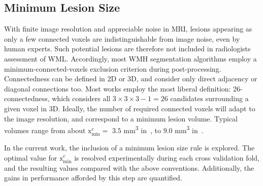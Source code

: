 \subsection{Minimum Lesion Size}\label{ss:vlr-minx}
With finite image resolution and appreciable noise in MRI,
lesions appearing as only a few connected voxels are indistinguishable from image noise,
even by human experts.
Such potential lesions are therefore not included in radiologists assessment of WML.
Accordingly, most WMH segmentation algorithms employ
a minimum-connected-voxels exclusion criterion during post-processing.
Connectedness can be defined in 2D or 3D,
and consider only direct adjacency or diagonal connections too.
Most works employ the most liberal definition: 26-connectedness,
which considers all $3\times3\times3-1=26$ candidates surrounding a given voxel in 3D.
Ideally, the number of required connected voxels will adapt to the image resolution,
and correspond to a minimum lesion volume.
Typical volumes range from about $\mathrm{x}_{\min}^{c} = $
$3.5$ mm\textsuperscript{3} in~\cite{Steenwijk2013,Fartaria2015}, to 
$9.0$ mm\textsuperscript{3} in~\cite{Yoo2014,Elliott2013}.
\par
In the current work, the inclusion of a minimum lesion size rule is explored.
The optimal value for $\mathrm{x}_{\min}^{c}$ is resolved experimentally
during each cross validation fold, and the resulting values compared with the above conventions.
Additionally, the gains in performance afforded by this step are quantified.
